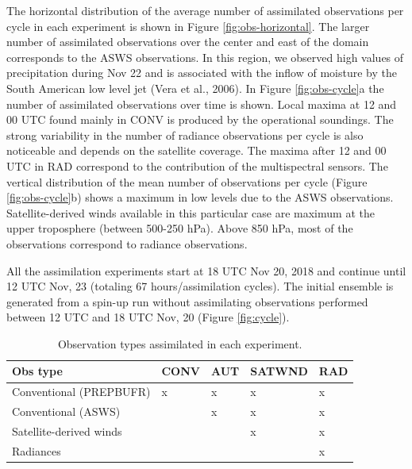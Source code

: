 \documentclass[final,5p,times,twocolumn,authoryear]{elsarticle} %
\begin{document}
The horizontal distribution of the average number of assimilated observations per cycle in each experiment is shown in Figure \ref{fig:obs-horizontal}. The larger number of assimilated observations over the center and east of the domain corresponds to the ASWS observations. In this region, we observed high values of precipitation during Nov 22 and is associated with the inflow of moisture by the South American low level jet (Vera et al., 2006). In Figure \ref{fig:obs-cycle}a the number of assimilated observations over time is shown. Local maxima at 12 and 00 UTC found mainly in CONV is produced by the operational soundings. The strong variability in the number of radiance observations per cycle is also noticeable and depends on the satellite coverage. The maxima after 12 and 00 UTC in RAD correspond to the contribution of the multispectral sensors. The vertical distribution of the mean number of observations per cycle (Figure \ref{fig:obs-cycle}b) shows a maximum in low levels due to the ASWS observations. Satellite-derived winds available in this particular case are maximum at the upper troposphere (between 500-250 hPa). Above 850 hPa, most of the observations correspond to radiance observations.

All the assimilation experiments start at 18 UTC Nov 20, 2018 and continue until 12 UTC Nov, 23 (totaling 67 hours/assimilation cycles). The initial ensemble is generated from a spin-up run without assimilating observations performed between 12 UTC and 18 UTC Nov, 20 (Figure \ref{fig:cycle}).

\begin{table}

\caption{\label{tab:table-exp}Observation types assimilated in each experiment.}
\centering
\begin{tabu} to 
\toprule
Obs type & CONV & AUT & SATWND & RAD\\
\midrule
Conventional (PREPBUFR) & x & x & x & x\\
Conventional (ASWS) &  & x & x & x\\
Satellite-derived winds &  &  & x & x\\
Radiances &  &  &  & x\\
\bottomrule
\end{tabu}
\end{table}
\end{document}
